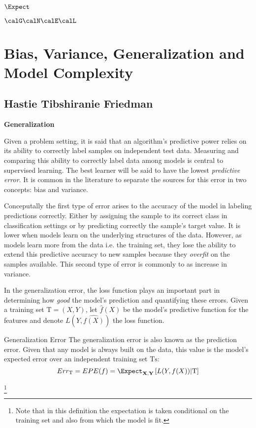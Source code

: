  
$\Expect$

$\calG \calN \calE \calL$

\section{Bias, Variance, Generalization and Model Complexity}


\subsection{Hastie Tibshiranie Friedman}

\textbf{Generalization}

Given a problem setting, it is said that an algorithm's predictive power relies on its ability to correctly label samples on independent test data. Measuring and comparing this ability to correctly label data among models is central to supervised learning.  The best learner will be said to have the lowest \textit{predictive error}. It is common in the literature \cite{james-biasVarianceGeneral} to separate the sources for this error in two concepts: bias and variance.

Conceputally the first type of error arises to the accuracy of the model in labeling predictions correctly. Either by assigning the sample to its correct class in classification settings or by predicting correctly the sample's target value. It is lower when models learn on the underlying structures of the data. However, as models learn more from the data i.e. the training set, they lose the ability to extend this predictive accuracy to new samples because they \textit{overfit} on the samples available. This second type of error is commonly to as increase in variance.

In the generalization error, the loss function plays an important part in determining how \textit{good} the model's prediction and quantifying these errors. Given a training set $\mathrm{T} = (X,Y)$, let $\hat{f}(X)$ be the model's predictive function for the features and denote $L( Y,\hat{f(X)} )$ the loss function. 

\cite{james-biasVarianceGeneral}

\begin{definition}{Generalization Error}
	The generalization error is also known as the prediction error. Given that any model is always built on the data, this value is the model's expected error over an independent training set $\mathrm{Ts}$:
	$$ Err_{\mathrm{T}} =  EPE(f)= \Expect_{\textbf{X},\textbf{Y}} \left[ L(Y,f(X)) |  \mathrm{T}\right]$$
\end{definition}\footnote{Note that in this definition the expectation is taken conditional on the training set and also from which the model is fit.}

